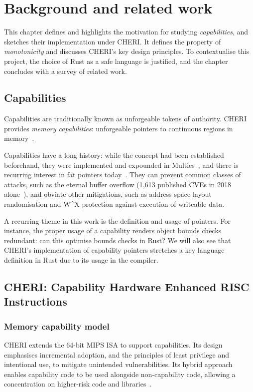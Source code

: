 \documentclass[dissertation.tex]{subfiles}
\begin{document}
\chapter{Background and related work}
\label{ch:bg}


This chapter defines and highlights the motivation for studying
\emph{capabilities}, and sketches their implementation under CHERI.
It defines the property of \emph{monotonicity} and discusses CHERI's key
design principles.
To contextualise this project, the choice of Rust as a safe language is
justified, and the chapter concludes with a survey of related work.


\section{Capabilities}
\label{sec:bg-caps}
Capabilities are traditionally known as unforgeable tokens of authority.
CHERI provides \emph{memory capabilities}: unforgeable pointers to
continuous regions in memory~\cite{cheri-risc-2014}.

Capabilities have a long history: while the concept had been established
beforehand, they were implemented and expounded in
Multics~\cite{bell-lapadula}, and there is recurring interest in fat
pointers today~\cite{devietti-hardbound,lowfat-kwon}.
They can prevent common classes of attacks, such as the
eternal buffer overflow (1,613 published CVEs in 2018
alone~\cite{nist-nvd-overflow-2018}), and obviate other mitigations,
such as address-space layout randomisation and W\^{}X protection
against execution of writeable data.

A recurring theme in this work is the definition and usage of pointers.
For instance, the proper usage of a capability renders object bounds
checks redundant: can this optimise bounds checks in Rust?
We will also see that CHERI's implementation of capability pointers
stretches a key language definition in Rust due to its usage in the
compiler.


\section{CHERI: Capability Hardware Enhanced RISC Instructions}

\subsection{Memory capability model}

CHERI extends the 64-bit MIPS ISA to support capabilities.
Its design emphasises incremental adoption, and the principles of least
privilege and intentional use, to mitigate unintended vulnerabilities.
Its hybrid approach enables capability code to be used alongside
non-capability code, allowing a concentration on higher-risk code and
libraries~\cite{cheri-v6}.
\end{document}

